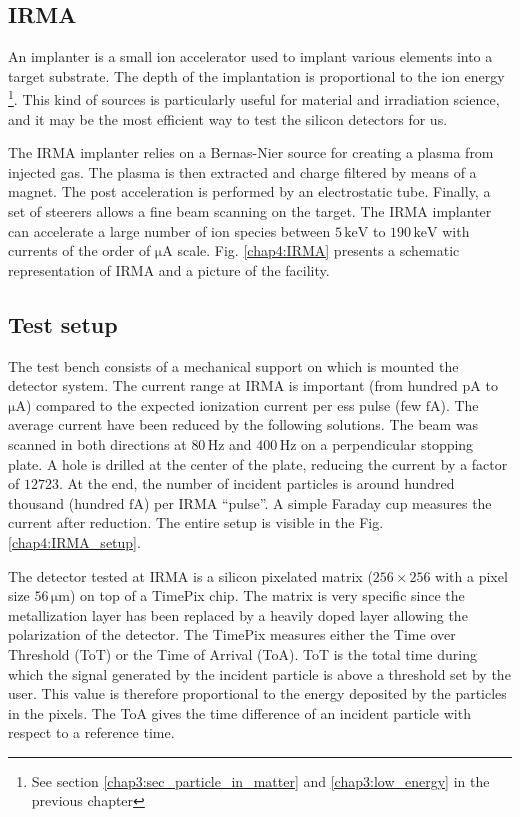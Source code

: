 \begin{refsection}
  \subsection{IRMA}
  An implanter is a small ion accelerator used to implant various elements into a target substrate. The depth of the implantation is proportional to the ion energy \footnote{See section \ref{chap3:sec_particle_in_matter} and \ref{chap3:low_energy} in the previous chapter}. This kind of sources is particularly useful for material and irradiation science, and it may be the most efficient way to test the silicon detectors for us.

  The IRMA implanter \cite{Chaumont1981} relies on a Bernas-Nier source \cite{Paris1981} for creating a plasma from injected gas. The plasma is then extracted and charge filtered by means of a magnet. The post acceleration is performed by an electrostatic tube. Finally, a set of steerers allows a fine beam scanning on the target. The IRMA implanter can accelerate a large number of ion species between $5 \,\mathrm{keV}$ to $190 \,\mathrm{keV}$ with currents of the order of $\mathrm{\mu A}$ scale. Fig. \ref{chap4:IRMA} presents a schematic representation of IRMA and a picture of the facility.

  

  \subsection{Test setup}

  The test bench consists of a mechanical support on which is mounted the detector system. The current range at IRMA is important (from hundred $\mathrm{pA}$ to $\mathrm{\mu A}$) compared to the expected ionization current per \acrshort{ess} pulse (few $\mathrm{fA}$). The average current have been reduced by the following solutions. The beam was scanned in both directions at $80 \,\mathrm{Hz}$ and $400\,\mathrm{Hz}$ on a perpendicular stopping plate. A hole is drilled at the center of the plate, reducing the current by a factor of $12723$. At the end, the number of incident particles is around hundred thousand (hundred $\mathrm{fA}$) per IRMA “pulse”. A simple Faraday cup measures the current after reduction. The entire setup is visible in the Fig. \ref{chap4:IRMA_setup}.

  

  The detector tested at IRMA is a silicon pixelated matrix ($256 \times 256$ with a pixel size $56\,\mathrm{\mu m}$) on top of a TimePix chip. The matrix is ​​very specific since the metallization layer has been replaced by a heavily doped layer allowing the polarization of the detector. The TimePix measures either the Time over Threshold (ToT) or the Time of Arrival (ToA). ToT is the total time during which the signal generated by the incident particle is above a threshold set by the user. This value is therefore proportional to the energy deposited by the particles in the pixels. The ToA gives the time difference of an incident particle with respect to a reference time.


\end{refsection}
